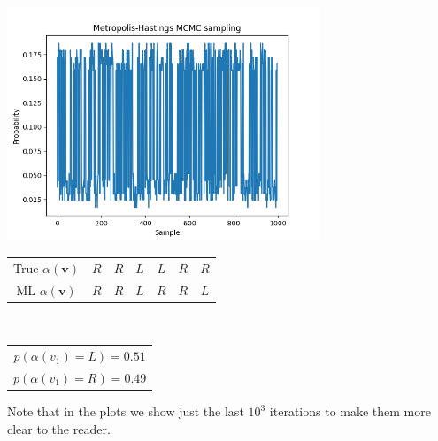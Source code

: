 \documentclass[]{article}
\begin{document}
\begin{center}
	\includegraphics[height=7cm]{task3/V_6_T_6_N_10000.png}
	\begin{tabular}{| c | c | c | c | c | c | c |}
		True $\alpha(\mathbf{v})$ & $R$ & $R$ & $L$ & $L$ & $R$ & $R$ \\
		ML $\alpha(\mathbf{v})$ & $R$ & $R$ & $L$ & $R$ & $R$ & $L$ \\
	\end{tabular}
	\\
	\begin{tabular}{| c |}
		$p(\alpha(v_1)=L) = 0.51 $ \\
		$p(\alpha(v_1)=R) = 0.49 $ \\
	\end{tabular}
\end{center}
Note that in the plots we show just the last $10^3$ iterations to make them more clear to the reader. 
\end{document}
